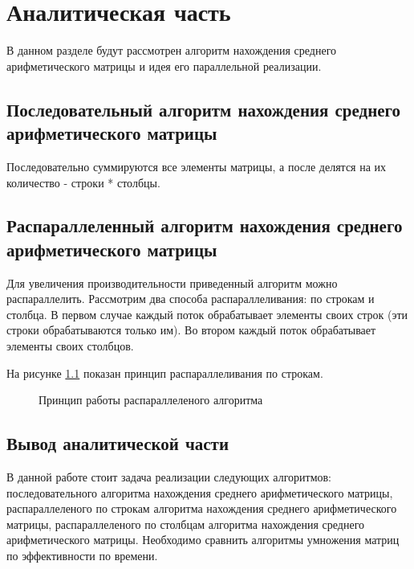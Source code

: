 \chapter{Аналитическая часть}\label{Analis}

В данном разделе будут рассмотрен алгоритм нахождения среднего арифметического матрицы и
идея его параллельной реализации.

\section{Последовательный алгоритм нахождения среднего арифметического матрицы}\label{BubbleSort}

Последовательно суммируются все элементы матрицы, а после делятся на их количество - строки * столбцы.

\section{Распараллеленный алгоритм нахождения среднего арифметического матрицы}\label{ChoiseSort}

Для увеличения производительности приведенный алгоритм можно распараллелить. Рассмотрим два способа распараллеливания: по строкам и
столбца. В первом случае каждый поток обрабатывает элементы своих строк (эти строки обрабатываются только им). Во втором каждый поток 
обрабатывает элементы своих столбцов.

На рисунке \ref{ris:ill} показан принцип распараллеливания по строкам.

\begin{figure}[H]
  \center{\texttt{[image: l1.il]}}
  \caption{Принцип работы распараллеленого алгоритма}
  \label{ris:ill}
\end{figure}


\section{Вывод аналитической части}\label{End_analis_chapter}

В данной работе стоит задача реализации следующих алгоритмов: последовательного алгоритма нахождения среднего арифметического матрицы,
распараллеленого по строкам алгоритма нахождения среднего арифметического матрицы, распараллеленого по столбцам алгоритма нахождения
среднего арифметического матрицы. Необходимо сравнить алгоритмы умножения матриц по эффективности по времени.
 
